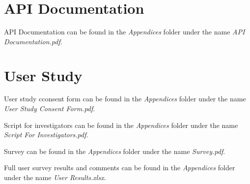 \begin{appendices}

	\chapter{API Documentation} \label{app:apidoc}

		API Documentation can be found in the \emph{Appendices} folder under the name \emph{API Documentation.pdf}.

	\chapter{User Study} \label{app:userstudydocs}

		User study cconsent form can be found in the \emph{Appendices} folder under the name \emph{User Study Consent Form.pdf}.
		
		Script for investigators can be found in the \emph{Appendices} folder under the name \emph{Script For Investigators.pdf}.

		Survey can be found in the \emph{Appendices} folder under the name \emph{Survey.pdf}.
		
		Full user survey results and comments can be found in the \emph{Appendices} folder under the name \emph{User Results.xlsx}.

\end{appendices}